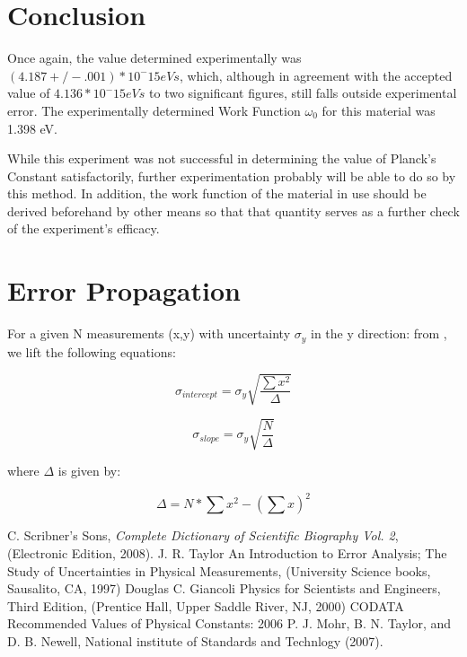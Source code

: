\documentclass[aps,pre,twocolumn,nofootinbib]{revtex4}
\begin{document}
\section{Conclusion}
Once again, the value determined experimentally was $(4.187 +/- .001)*10^-15 eV s$, which, although in agreement with the accepted value of $4.136*10^-15 eV s$ to two significant figures, still falls outside experimental error.  The experimentally determined Work Function $\omega_0$ for this material was 1.398 eV.  

While this experiment was not successful in determining the value of Planck's Constant satisfactorily, further experimentation probably will be able to do so by this method. In addition, the work function of the material in use should be derived beforehand by other means so that that quantity serves as a further check of the experiment's efficacy.  

\appendix*
\section{Error Propagation}
For a given N measurements (x,y) with uncertainty $\sigma_y$ in the y direction: from \cite{Taylor1997}, we lift the following equations: 

\begin{equation}
\label{errorA}
\sigma_{intercept}=\sigma_y \sqrt{\frac{\sum x^2}{\Delta}}
\end{equation}

\begin{equation}
\label{errorB}
\sigma_{slope}=\sigma_y \sqrt{\frac{N}{\Delta}}
\end{equation}

where $\Delta$ is given by:

\begin{equation}
\label{delta}
\Delta=N*\sum x^2-(\sum x)^2
\end{equation}

	\begin{thebibliography}{99}
 C. Scribner's Sons, \textit{Complete Dictionary of Scientific Biography Vol. 2},
  (Electronic Edition, 2008).
 J. R. Taylor An Introduction to Error Analysis; The Study of Uncertainties in Physical Measurements, (University Science books, Sausalito, CA, 1997)
 Douglas C. Giancoli Physics for Scientists and Engineers, Third Edition, (Prentice Hall, Upper Saddle River, NJ, 2000)
 CODATA Recommended Values of Physical Constants: 2006 P. J. Mohr, B. N. Taylor, and D. B. Newell, National institute of Standards and Technlogy (2007).
	\end{thebibliography}
	
\end{document}
